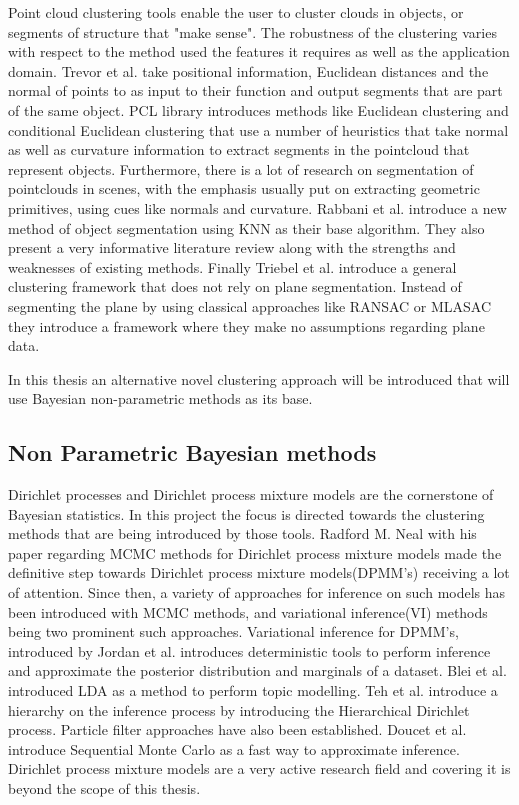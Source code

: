 \documentclass[twoside,hidelinks]{article}
\begin{document}
Point cloud clustering tools enable the user to cluster clouds in objects, or segments of structure that "make sense". The robustness of the clustering varies with respect to the method used the features it requires as well as the application domain.
Trevor et al.\cite{pointSeg} take positional information, Euclidean distances and the normal of points to as input to their function and output segments that are part of the same object. PCL library\cite{pcl} introduces methods like Euclidean clustering and conditional Euclidean clustering that use a number of heuristics that take normal as well as curvature information to extract segments in the pointcloud that represent objects. Furthermore, there is a lot of research on segmentation of pointclouds in scenes, with the emphasis usually put on extracting geometric primitives\cite{planarSeg},\cite{planarSeg2} using cues like normals and curvature. Rabbani et al.\cite{segOverview} introduce a new method of object segmentation using KNN as their base algorithm. They also present a very informative literature review along with the strengths and weaknesses of existing methods. Finally Triebel et al.\cite{smartSeg} introduce a general clustering framework that does not rely on plane segmentation. Instead of segmenting the plane by using classical approaches like RANSAC or MLASAC they introduce a framework where they make no assumptions regarding plane data. 
 
In this thesis an alternative novel clustering approach will be introduced that will use Bayesian non-parametric methods as its base.

\subsection{Non Parametric Bayesian methods}

Dirichlet processes and Dirichlet process mixture models are the cornerstone of Bayesian statistics. In this project the focus is directed towards the clustering methods that are being introduced by those tools. Radford M. Neal\cite{bayes:neal} with his paper regarding MCMC methods for Dirichlet process mixture models made the definitive step towards Dirichlet process mixture models(DPMM's) receiving a lot of attention. Since then, a variety of approaches for inference on such models has been introduced with MCMC methods, and variational inference(VI) methods being two prominent such approaches. Variational inference for DPMM's, introduced by Jordan et al.\cite{bayes:jordan} introduces deterministic tools to perform inference and approximate the posterior distribution and marginals of a dataset. Blei et al.\cite{LDA} introduced LDA as a method to perform topic modelling. Teh et al.\cite{bayes:hier} introduce a hierarchy on the inference process by introducing the Hierarchical Dirichlet process. Particle filter approaches have also been established. Doucet et al.\cite{bayes:smc} introduce Sequential Monte Carlo as a fast way to approximate inference. Dirichlet process mixture models are a very active research field and covering it is beyond the scope of this thesis. 
\end{document}
